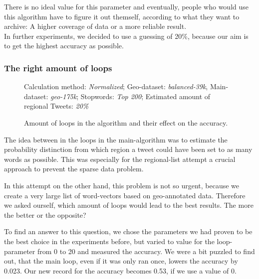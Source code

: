 \documentclass[../Main.tex]{subfiles}
\begin{document}
There is no ideal value for this parameter and eventually, people who would use this algorithm have to figure it out themself, according to what they want to archive: A higher coverage of data or a more reliable result. \\
In further experiments, we decided to use a guessing of 20\%, because our aim is to get the highest accuracy as possible.

\subsubsection{The right amount of loops}
\begin{figure}

Calculation method: \textit{Normalized}; Geo-dataset: \textit{balanced-39k}, Main-dataset: \textit{geo-175k}; Stopwords: \textit{Top 200}; Estimated amount of regional Tweets: \textit{20\%}
  \caption{Amount of loops in the algorithm and their effect on the accuracy.}
  \label{geo_graph3}
\end{figure}
The idea between in the loops in the main-algorithm was to estimate the probability distinction from which region a tweet could have been set to as many words as possible. This was especially for the regional-list attempt a crucial approach to prevent the sparse data problem.

In this attempt on the other hand, this problem is not so urgent, because we create a very large list of word-vectors based on geo-annotated data. Therefore we asked ourself, which amount of loops would lead to the best results. The more the better or the opposite? 

To find an answer to this question, we chose the parameters we had proven to be the best choice in the experiments before, but varied to value for the loop-parameter from 0 to 20 and measured the accuracy. 
We were a bit puzzled to find out, that the main loop, even if it was only ran once, lowers the accuracy by 0.023. Our new record for the accuracy becomes 0.53, if we use a value of 0. 
\end{document}
